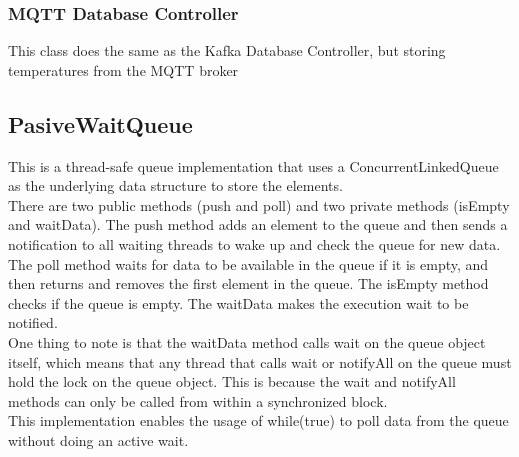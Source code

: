 \documentclass[../informe.tex]{subfiles}
\begin{document}
\subsubsection{MQTT Database Controller}
This class does the same as the Kafka Database Controller, but storing temperatures from the MQTT broker

\subsection{PasiveWaitQueue}
This is a thread-safe queue implementation that uses a ConcurrentLinkedQueue as the underlying data structure to store the elements. \\ 

There are two public methods (push and poll) and two private methods (isEmpty and waitData). The push method adds an element to the queue and then sends a notification to all waiting threads to wake up and check the queue for new data. The poll method waits for data to be available in the queue if it is empty, and then returns and removes the first element in the queue. The isEmpty method checks if the queue is empty. The waitData makes the execution wait to be notified. \\


One thing to note is that the waitData method calls wait on the queue object itself, which means that any thread that calls wait or notifyAll on the queue must hold the lock on the queue object. This is because the wait and notifyAll methods can only be called from within a synchronized block. \\

This implementation enables the usage of while(true) to poll data from the queue without doing an active wait. \\
\end{document}
